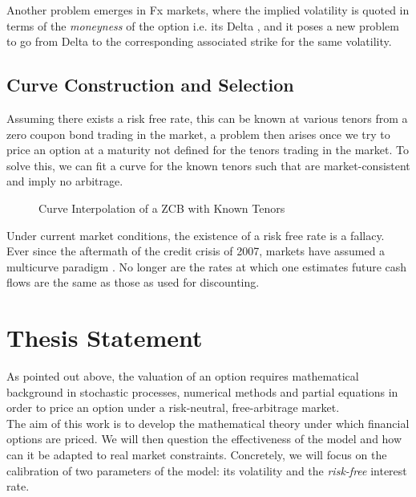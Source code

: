 \documentclass{article}
\begin{document}
Another problem emerges in Fx markets, where the implied volatility is quoted in terms of the \textit{moneyness} of the option i.e. its Delta \citep{wys}, and it poses a new problem to go from Delta to the corresponding associated strike for the same volatility.

\subsection{Curve Construction and Selection}
Assuming there exists a risk free rate, this can be known at various tenors from a zero coupon bond trading in the market, a problem then arises once we try to price an option at a maturity not defined for the tenors trading in the market. To solve this, we can fit a curve for the known tenors such that are market-consistent and imply no arbitrage. \\

\begin{figure}[h]
    \centering
    \caption{Curve Interpolation of a ZCB with Known Tenors}
\end{figure}

Under current market conditions, the existence of a risk free rate is a fallacy. Ever since the aftermath of the credit crisis of 2007, markets have assumed a multicurve paradigm \citep{len}. No longer are the rates at which one estimates future cash flows are the same as those as used for discounting.

\section{Thesis Statement}
As pointed out above, the valuation of an option requires mathematical background in stochastic processes, numerical methods and partial equations in order to price an option under a risk-neutral, free-arbitrage market.\\

The aim of this work is to develop the mathematical theory under which financial options are priced. We will then question the effectiveness of the model and how can it be adapted to real market constraints. Concretely, we will focus on the calibration of two parameters of the model: its volatility and the \textit{risk-free} interest rate.
\end{document}
